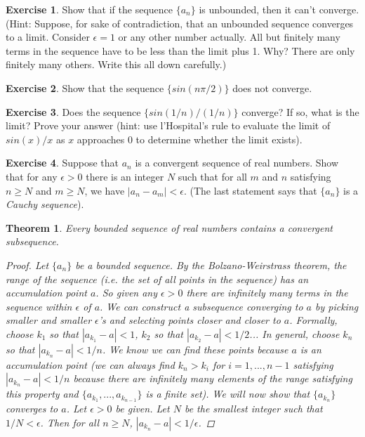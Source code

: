 \documentclass[11pt,a4paper]{report}
\theoremstyle{plain}
\newtheorem{thm}{Theorem}[section]
\theoremstyle{definition}
\newtheorem{exercise}{Exercise}[section]
\theoremstyle{remark}
\begin{document}
\begin{exercise} Show that if the sequence $\{a_n\}$ is unbounded, then it can't converge. (Hint: Suppose, for sake of contradiction, that an unbounded sequence converges to a limit. Consider $\epsilon = 1$ or any other number actually. All but finitely many terms in the sequence have to be less than the limit plus 1. Why?  There are only finitely many others.  Write this all down carefully.)
\end{exercise}
\begin{exercise} Show that the sequence $\{sin(n \pi / 2)\}$ does not converge.
\end{exercise}
\begin{exercise}
Does the sequence $\{sin(1/n) / (1/n)\}$ converge?  If so, what is the limit? Prove your answer (hint: use l'Hospital's rule to evaluate the limit of $sin(x) / x$ as $x$ approaches $0$ to determine whether the limit exists).
\end{exercise}
\begin{exercise}
Suppose that ${a_n}$ is a convergent sequence of real numbers.  Show that for any $\epsilon > 0$ there is an integer $N$ such that for all $m$ and $n$ satisfying $n \geq N$ and $m \geq N$, we have $|a_n - a_m|< \epsilon$. (The last statement says that $\{a_n\}$ is a \textit{Cauchy sequence}).
\end{exercise}
\begin{thm}
Every bounded sequence of real numbers contains a convergent subsequence.
\begin{proof}
Let $\{a_n\}$ be a bounded sequence.  By the Bolzano-Weirstrass theorem, the range of the sequence (i.e. the set of all points in the sequence) has an accumulation point $a$. So given any $\epsilon>0$ there are infinitely many terms in the sequence within $\epsilon$ of $a$.  We can construct a subsequence converging to $a$ by picking smaller and smaller $\epsilon$'s and selecting points closer and closer to $a$.  Formally, choose $k_1$ so that $|a_{k_1} - a| < 1$, $k_2$ so that $|a_{k_2} - a| < 1/2$...  In general, choose $k_n$ so that $|a_{k_n} - a| < 1/n$.  We know we can find these points because $a$ is an accumulation point (we can always find $k_n > k_i$ for $i = 1,..., n - 1$ satisfying $|a_{k_n} - a| < 1/n$ because there are infinitely many elements of the range satisfying this property and $\{a_{k_1}, ..., a_{k_{n-1}}\}$ is a finite set).  We will now show that $\{a_{k_n}\}$ converges to $a$.  Let $\epsilon>0$ be given. Let $N$ be the smallest integer such that $1/N < \epsilon$.  Then for all $n \geq N$, $|a_{k_n} - a| < 1/\epsilon$.
\end{proof}
\end{thm}
\end{document}
